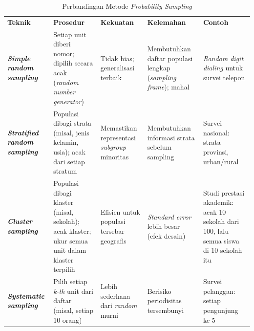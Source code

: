 \documentclass[
  indonesian,
  letterpaper,
  DIV=11,
  numbers=noendperiod]{scrreprt}
\begin{document}
\begin{longtable}[]{@{}
  >{\raggedright\arraybackslash}p{}
  >{\raggedright\arraybackslash}p{}
  >{\raggedright\arraybackslash}p{}
  >{\raggedright\arraybackslash}p{}
  >{\raggedright\arraybackslash}p{}@{}}
\caption{Perbandingan Metode \emph{Probability
Sampling}}\label{tbl-probsampling}\tabularnewline
\toprule\noalign{}
\endfirsthead
\endhead
\bottomrule\noalign{}
\endlastfoot
\textbf{Teknik} & \textbf{Prosedur} & \textbf{Kekuatan} &
\textbf{Kelemahan} & \textbf{Contoh} \\
\textbf{\emph{Simple random sampling}} & Setiap unit diberi nomor;
dipilih secara acak (\emph{random number generator}) & Tidak bias;
generalisasi terbaik & Membutuhkan daftar populasi lengkap
(\emph{sampling frame}); mahal & \emph{Random digit dialing} untuk
survei telepon \\
\textbf{\emph{Stratified random sampling}} & Populasi dibagi strata
(misal, jenis kelamin, usia); acak dari setiap stratum & Memastikan
representasi \emph{subgroup} minoritas & Membutuhkan informasi strata
sebelum sampling & Survei nasional: strata provinsi, urban/rural \\
\textbf{\emph{Cluster sampling}} & Populasi dibagi klaster (misal,
sekolah); acak klaster; ukur semua unit dalam klaster terpilih & Efisien
untuk populasi tersebar geografis & \emph{Standard error} lebih besar
(efek desain) & Studi prestasi akademik: acak 10 sekolah dari 100, lalu
semua siswa di 10 sekolah itu \\
\textbf{\emph{Systematic sampling}} & Pilih setiap \emph{k-th} unit dari
daftar (misal, setiap 10 orang) & Lebih sederhana dari \emph{random}
murni & Berisiko periodisitas tersembunyi & Survei pelanggan: setiap
pengunjung ke-5 \\
\end{longtable}
\end{document}
